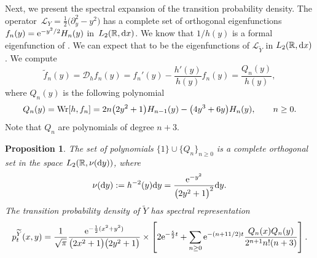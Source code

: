 \documentclass[10pt,a4paper]{amsart}
\numberwithin{equation}{section}
\newtheorem{Proposition}[Theorem]{Proposition}
\theoremstyle{definition}
\def\L{{\mathcal L}}
\def\r{{\mathbb R}}
\def\wr{{\textnormal{Wr}}}
\def\d{{\textnormal d}}
\begin{document}
Next, we present the spectral expansion of the transition probability density. The operator~${\L_Y=\frac{1}{2} \bigl(\partial_y^2 - y^2\bigr)}$ has a complete set of orthogonal eigenfunctions $f_n(y)={\rm e}^{-y^2/2}H_n(y)$ in~$L_2(\r,\d x)$. We know that $1/h(y)$ is a formal eigenfunction of . We can expect that 
to be the eigenfunctions of $\L_{\widetilde Y}$ in $L_2(\r, \d x)$. We compute
\[
\tilde f_n(y) ={\mathcal D}_h f_n(y)=f_n'(y)-\frac{h'(y)}{h(y)}f_n(y)=\frac{Q_n(y)}{h(y)},
\]
where $Q_n(y)$ is the following polynomial
\[
Q_n(y)=\wr[h,f_n]=2n\bigl(2y^2+1\bigr) H_{n-1}(y)-\bigl(4y^3+6y\bigr) H_n(y), \qquad n\ge 0.
\]
Note that $Q_n$ are polynomials of degree $n+3$.
\begin{Proposition}
The set of polynomials $\{1\} \cup \{Q_n\}_{n \ge 0}$ is a complete orthogonal set in the space $L_2(\r, \nu(\d y))$, where
\[
\nu(\d y):=h^{-2}(y) \d y=\frac{{\rm e}^{-y^2}}{\bigl(2y^2+1\bigr)^2} \d y.
\]
The transition probability density of $\widetilde Y$ has spectral representation
\begin{equation}\label{OU_spectral}
p^{\widetilde Y}_t(x,y)=
\frac{1}{\sqrt{\pi}} \frac{{\rm e}^{-\frac{1}{2}(x^2+y^2)}}
{\bigl(2x^2+1\bigr)\bigl(2y^2+1\bigr)} \times
\left[ 2 {\rm e}^{-\frac{5}{2} t} +\sum\limits_{n\ge 0} {\rm e}^{-(n+11/2) t} \frac{Q_n(x) Q_n(y)}
{2^{n+1} n! (n+3)} \right].
\end{equation}
\end{Proposition}
\end{document}
